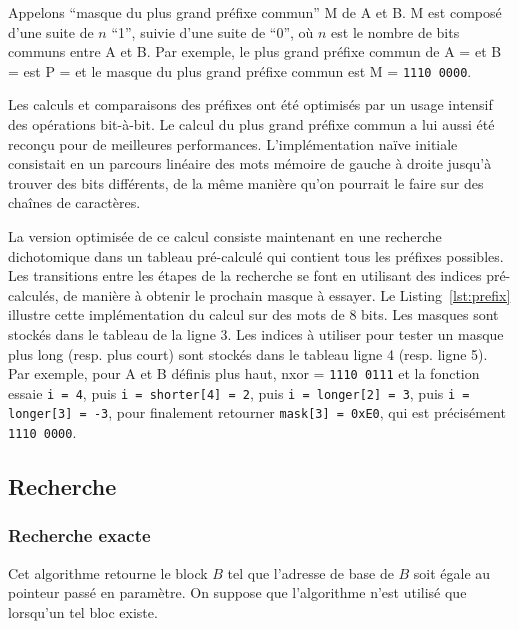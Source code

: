 


Appelons ``masque du plus grand préfixe commun'' M de A et B. M est composé
d'une suite de $n$ ``1'', suivie d'une suite de ``0'', où $n$ est le nombre de
bits communs entre A et B. Par exemple, le plus grand préfixe commun de
A =  et B =  est P = 
et le masque du plus grand préfixe commun est M = \texttt{1110\,0000}.

Les calculs et comparaisons des préfixes ont été optimisés par un usage
intensif des opérations bit-à-bit. Le calcul du plus grand préfixe commun a lui
aussi été reconçu pour de meilleures performances. L'implémentation naïve
initiale consistait en un parcours linéaire des mots mémoire de gauche à droite
jusqu'à trouver des bits différents, de la même manière qu'on pourrait le faire 
sur des chaînes de caractères.

La version optimisée de ce calcul consiste
maintenant en une recherche dichotomique dans un tableau pré-calculé qui
contient tous les préfixes possibles. Les transitions entre les étapes de la
recherche se font en utilisant des indices pré-calculés, de manière à obtenir
le prochain masque à essayer. Le Listing~\ref{lst:prefix} illustre cette
implémentation du calcul sur des mots de 8 bits. Les masques sont
stockés dans le tableau de la ligne 3. Les indices à utiliser pour tester un
masque plus long (resp. plus court) sont stockés dans le tableau ligne 4 (resp.
ligne 5). Par exemple, pour A et B définis plus haut, nxor = \texttt{1110\,0111}
et la fonction essaie \lstinline'i = 4', puis \lstinline'i = shorter[4] = 2',
puis \lstinline'i = longer[2] = 3', puis \lstinline'i = longer[3] = -3', pour
finalement retourner \lstinline'mask[3] = 0xE0', qui
est précisément \texttt{1110\,0000}.



\subsection{Recherche}



\subsubsection*{Recherche exacte}

Cet algorithme retourne le block $B$ tel que l'adresse de base de $B$ soit égale
au pointeur passé en paramètre. On suppose que l'algorithme n'est utilisé que
lorsqu'un tel bloc existe.

